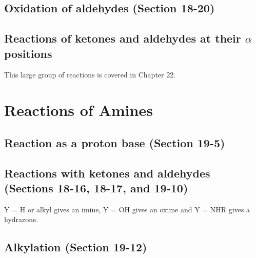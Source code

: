 \subsection{Oxidation of aldehydes \normalfont(Section 18-20)}



\subsection{Reactions of ketones and aldehydes at their $\alpha$ positions}

This large group of reactions is covered in Chapter 22.



\section{Reactions of Amines}


\subsection{Reaction as a proton base \normalfont(Section 19-5)}



\subsection{Reactions with ketones and aldehydes \normalfont(Sections 18-16, 18-17, and 19-10)}

Y = H or alkyl gives an imine,  Y = OH gives an oxime and Y = NHR gives a hydrazone.


\subsection{Alkylation \normalfont(Section 19-12)}

